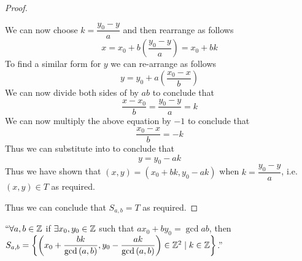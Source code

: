 \begin{proof}
\begin{itemize}
                    We can now choose $k = \dfrac{y_0 - y}{a}$ and then rearrange
                     as follows
                    \[
                        x = x_0 + b\left(\frac{y_0 - y}{a}\right) = x_0 + bk
                    \]
                    To find a similar form for $y$ we can re-arrange
                     as follows
                    \begin{equation}
                        y = y_0 + a\left(\frac{x_0 - x}{b}\right)
                        \label{LDE All Solutions equation 3}
                    \end{equation}
                    We can now divide both sides of  by
                    $ab$ to conclude that
                    \[
                        \frac{x - x_0}{b} = \frac{y_0 - y}{a} = k
                    \]
                    We can now multiply the above equation by $-1$ to conclude that
                    \begin{equation}
                        \frac{x_0 - x}{b} = -k 
                        \label{LDE All Solutions equation 4}
                    \end{equation}
                    Thus we can substitute  into
                     to conclude that
                    \[
                        y = y_0 - ak
                    \]
                    Thus we have shown that $(x, y) = (x_0 + bk, y_0 - ak)$ when $k = \dfrac{y_0 - y}{a}$,
                    i.e. $(x, y) \in T$ as required.
            \end{itemize} 
           Thus we can conclude that $S_{a, b} = T$ as required. \QED
        \end{proof}
        \begin{theorem}
            $``\forall a, b \in \mathbb{Z}$ if $\exists x_0, y_0 \in \mathbb{Z}$ such that
            $ax_0 + by_0 = \gcd{a}{b}$, then  $S_{a, b} =
            \left\{\left(x_0 + \dfrac{bk}{\mathrm{gcd}\left(a, b\right)}, y_0 - \dfrac{ak}{\mathrm{gcd}\left(a, b\right)}\right) \in \mathbb{Z}^2 \mid
            k \in \mathbb{Z}\right\}$.''
        \end{theorem}
